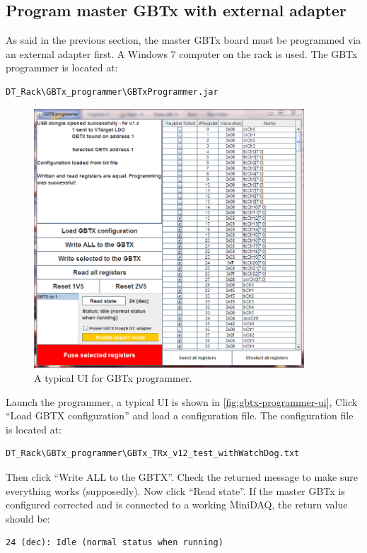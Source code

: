 \subsection{Program master GBTx with external \itwoc adapter}
As said in the previous section, the master GBTx board must be programmed via an
external \itwoc adapter first.
A Windows 7 computer on the rack is used. The GBTx programmer is located at:

\begin{verbatim}
DT_Rack\GBTx_programmer\GBTxProgrammer.jar
\end{verbatim}

\begin{figure}[ht]
    \centering
    \includegraphics[width=0.9\textwidth]{res/gbtx_programmer_v1_ui.png}
    \caption{A typical UI for GBTx programmer.}
    \label{fig:gbtx-programmer-ui}
\end{figure}

Launch the programmer, a typical UI is shown in
\autoref{fig:gbtx-programmer-ui},
Click ``Load GBTX configuration'' and load a configuration file.
The configuration file is located at:

\begin{verbatim}
DT_Rack\GBTx_programmer\GBTx_TRx_v12_test_withWatchDog.txt
\end{verbatim}

Then click ``Write ALL to the GBTX''. Check the returned message to make sure
everything works (supposedly).
Now click ``Read state''.
If the master GBTx is configured corrected and is connected to a working
MiniDAQ, the return value should be:

\begin{verbatim}
24 (dec): Idle (normal status when running)
\end{verbatim}
